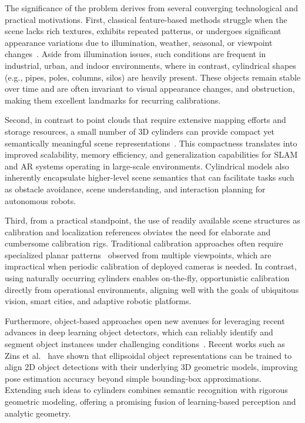 
The significance of the problem derives from several converging technological and practical motivations. First, classical feature-based methods struggle when the scene lacks rich textures, exhibits repeated patterns, or undergoes significant appearance variations due to illumination, weather, seasonal, or viewpoint changes~\cite{gummeson22pose}. Aside from illumination issues, such conditions are frequent in industrial, urban, and indoor environments, where in contrast, cylindrical shapes (e.g., pipes, poles, columns, silos) are heavily present. These objects remain stable over time and are often invariant to visual appearance changes, and obstruction, making them excellent landmarks for recurring calibrations.

Second, in contrast to point clouds that require extensive mapping efforts and storage resources, a small number of 3D cylinders can provide compact yet semantically meaningful scene representations~\cite{gummeson22pose,Zins2022}. This compactness translates into improved scalability, memory efficiency, and generalization capabilities for SLAM and AR systems operating in large-scale environments. Cylindrical models also inherently encapsulate higher-level scene semantics that can facilitate tasks such as obstacle avoidance, scene understanding, and interaction planning for autonomous robots.

Third, from a practical standpoint, the use of readily available scene structures as calibration and localization references obviates the need for elaborate and cumbersome calibration rigs. Traditional calibration approaches often require specialized planar patterns~\cite{Zhang2000,Maybank1992} observed from multiple viewpoints, which are impractical when periodic calibration of deployed cameras is needed. In contrast, using naturally occurring cylinders enables on-the-fly, opportunistic calibration directly from operational environments, aligning well with the goals of ubiquitous vision, smart cities, and adaptive robotic platforms.

Furthermore, object-based approaches open new avenues for leveraging recent advances in deep learning object detectors, which can reliably identify and segment object instances under challenging conditions~\cite{Redmon2018,Girshick2015,He2020}. Recent works such as Zins et al.~\cite{Zins2022} have shown that ellipsoidal object representations can be trained to align 2D object detections with their underlying 3D geometric models, improving pose estimation accuracy beyond simple bounding-box approximations. Extending such ideas to cylinders combines semantic recognition with rigorous geometric modeling, offering a promising fusion of learning-based perception and analytic geometry.


